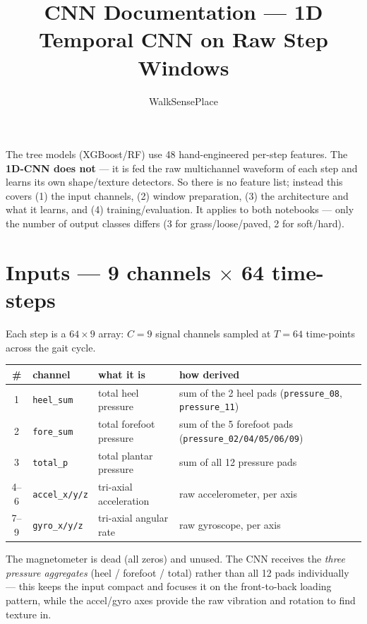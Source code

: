 \documentclass[11pt]{article}
\title{\textbf{CNN Documentation — 1D Temporal CNN on Raw Step Windows}}
\author{WalkSensePlace}
\date{}
\newcommand{\code}[1]{\texttt{#1}}
\begin{document}
\maketitle

The tree models (XGBoost/RF) use 48 hand-engineered per-step features. The \textbf{1D-CNN does
not} --- it is fed the raw multichannel waveform of each step and learns its own shape/texture
detectors. So there is no feature list; instead this covers (1) the input channels, (2) window
preparation, (3) the architecture and what it learns, and (4) training/evaluation. It applies to
both notebooks --- only the number of output classes differs (3 for grass/loose/paved, 2 for
soft/hard).

\section{Inputs --- 9 channels $\times$ 64 time-steps}
Each step is a $64\times 9$ array: $C=9$ signal channels sampled at $T=64$ time-points across the
gait cycle.
\begin{center}
\begin{tabular}{@{}clll@{}}
\toprule
\# & channel & what it is & how derived \\
\midrule
1 & \code{heel_sum}    & total heel pressure     & sum of the 2 heel pads (\code{pressure_08}, \code{pressure_11}) \\
2 & \code{fore_sum}    & total forefoot pressure & sum of the 5 forefoot pads (\code{pressure_02/04/05/06/09}) \\
3 & \code{total_p}     & total plantar pressure  & sum of all 12 pressure pads \\
4--6 & \code{accel_x/y/z} & tri-axial acceleration & raw accelerometer, per axis \\
7--9 & \code{gyro_x/y/z}  & tri-axial angular rate & raw gyroscope, per axis \\
\bottomrule
\end{tabular}
\end{center}
The magnetometer is dead (all zeros) and unused. The CNN receives the \emph{three pressure
aggregates} (heel / forefoot / total) rather than all 12 pads individually --- this keeps the input
compact and focuses it on the front-to-back loading pattern, while the accel/gyro axes provide the
raw vibration and rotation to find texture in.
\end{document}
